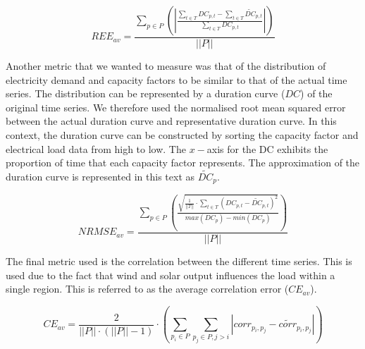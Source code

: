 \documentclass[final,3p,times,twocolumn,numbers]{elsarticle}
\begin{document}
\begin{equation}
	REE_{av}=\frac
	{\sum\limits_{p\in P}\left(\left|
	\frac
	{\sum\limits_{t\in T}DC_{p,t}-\sum\limits_{t\in T}\widetilde{DC}_{p,t}}
	{\sum\limits_{t\in T}DC_{p,t}}
	\right|\right)
	}
	{\left|\left|P\right|\right|}
\end{equation}

Another metric that we wanted to measure was that of the distribution of electricity demand and capacity factors to be similar to that of the actual time series. The distribution can be represented by a duration curve ($DC$) of the original time series. We therefore used the normalised root mean squared error between the actual duration curve and representative duration curve. In this context, the duration curve can be constructed by sorting the capacity factor and electrical load data from high to low. The $x-$axis for the DC exhibits the proportion of time that each capacity factor represents. The approximation of the duration curve is represented in this text as $\widetilde{DC}_p$.



\begin{equation}
	NRMSE_{av}=\frac
	{\sum\limits_{p\in P}\left(\frac
	{\sqrt{
	\frac{1}{\left|\left|T\right|\right|}
	\cdot
	\sum\limits_{t\in T}(DC_{p,t}-\widetilde{DC}_{p,t})^2}
	}
	{max(DC_p)-min(DC_p)}
	\right)}
	{\left|\left|P\right|\right|}
\end{equation}


The final metric used is the correlation between the different time series. This is used due to the fact that wind and solar output influences the load within a single region. This is referred to as the average correlation error ($CE_{av}$).

\begin{equation}
	CE_{av}=\frac{2}{\left|\left|P\right|\right|\cdot(\left|\left|P\right|\right|-1)}\cdot
	\left(
	\sum\limits_{p_i\in P}\sum\limits_{p_j\in P,j>i}
	\left|
	corr_{p_i,p_j}-\widetilde{corr}_{p_i,p_j}
	\right|
	\right)
\end{equation}
\end{document}
